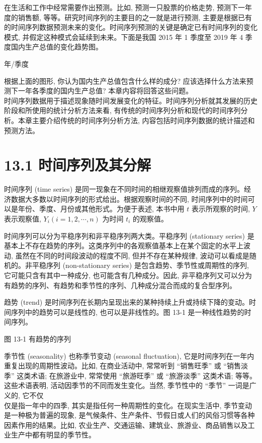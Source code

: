 \documentclass[10pt]{article}
\begin{document}
\begin{CJK*}{UTF8}{bsmi}
在生活和工作中经常需要作出预测。比如, 预测一只股票的价格走势, 预测下一年度的销售额, 等等。研究时间序列的主要目的之一就是进行预测, 主要是根据已有的时间序列数据预测未来的变化。时间序列预测的关键是确定已有时间序列的变化模式, 并假定这种模式会延续到未来。下面是我国 2015 年 1 季度至 2019 年 4 季度国内生产总值的变化趋势图。

\begin{center}
\end{center}

年/季度

根据上面的图形, 你认为国内生产总值包含什么样的成分? 应该选择什么方法来预测下一年各季度的国内生产总值? 本章内容将回答这些问题。\\
时间序列数据用于描述现象随时间发展变化的特征。时间序列分析就其发展的历史阶段和所使用的统计分析方法来看, 有传统的时间序列分析和现代的时间序列分析。本章主要介绍传统的时间序列分析方法, 内容包括时间序列数据的统计描述和预测方法。

\section*{13.1 时间序列及其分解}
时间序列 (time series) 是同一现象在不同时间的相继观察值排列而成的序列。经济数据大多数以时间序列的形式给出。根据观察时间的不同, 时间序列中的时间可以是年份、季度、月份或其他形式。为便于表述, 本书中用 $t$ 表示所观察的时间, $Y$ 表示观察值, $Y_{i}(i=1,2, \cdots, n)$ 为时间 $t_{i}$ 的观察值。

时间序列可以分为平稳序列和非平稳序列两大类。平稳序列 (stationary series) 是基本上不存在趋势的序列。这类序列中的各观察值基本上在某个固定的水平上波动, 虽然在不同的时间段波动的程度不同, 但并不存在某种规律, 波动可以看成是随机的。非平稳序列 (non-stationary series) 是包含趋势、季节性或周期性的序列, 它可能只含有其中一种成分, 也可能含有几种成分。因此, 非平稳序列又可以分为有趋势的序列、有趋势和季节性的序列、几种成分混合而成的复合型序列。

趋势 (trend) 是时间序列在长期内呈现出来的某种持续上升或持续下降的变动。时间序列中的趋势可以是线性的, 也可以是非线性的。图 13-1 是一种线性趋势的时间序列。

\begin{center}
\end{center}

图 13-1 有趋势的序列

季节性 (seasonality) 也称季节变动 (seasonal fluctuation), 它是时间序列在一年内重复出现的周期性波动。比如, 在商业活动中, 常常听到 “销售旺季” 或 “销售淡季” 这类术语; 在旅游业中, 常常使用 “旅游旺季” 或 “旅游淡季” 这类术语; 等等。这些术语表明, 活动因季节的不同而发生变化。当然, 季节性中的 “季节” 一词是广义的, 它不仅\\
仅是指一年中的四季, 其实是指任何一种周期性的变化。在现实生活中, 季节变动是一种极为普遍的现象, 是气候条件、生产条件、节假日或人们的风俗习惯等各种因素作用的结果。比如, 农业生产、交通运输、建筑业、旅游业、商品销售以及工业生产中都有明显的季节性。


\end{CJK*}
\end{document}
